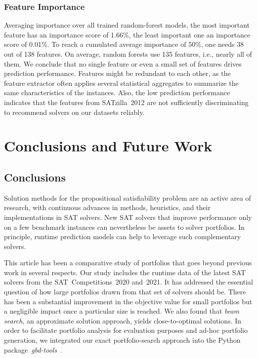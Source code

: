 \documentclass[a4paper,USenglish,pdfa]{lipics-v2021} %
\begin{document}
\subsubsection{Feature Importance}

Averaging importance over all trained random-forest models, the most important feature has an importance score of 1.66\%, the least important one an importance score of 0.01\%.
To reach a cumulated average importance of 50\%, one needs 38 out of 138 features.
On average, random forests use 135 features, i.e., nearly all of them.
We conclude that no single feature or even a small set of features drives prediction performance.
Features might be redundant to each other, as the feature extractor often applies several statistical aggregates to summarize the same characteristics of the instances.
Also, the low prediction performance indicates that the features from SATzilla~2012 are not sufficiently discriminating to recommend solvers on our datasets reliably.

\section{Conclusions and Future Work}
\label{sec:conclusion}

\subsection{Conclusions}

Solution methods for the propositional satisfiability problem are an active area of research, with continuous advances in methods, heuristics, and their implementations in SAT solvers. 
New SAT solvers that improve performance only on a few benchmark instances can nevertheless be assets to solver portfolios. 
In principle, runtime prediction models can help to leverage such complementary solvers. 

This article has been a comparative study of portfolios that goes beyond previous work in several respects.
Our study includes the runtime data of the latest SAT solvers from the SAT~Competitions~2020 and~2021. 
It has addressed the essential question of how large portfolios drawn from that set of solvers should be.
There has been a substantial improvement in the objective value for small portfolios but a negligible impact once a particular size is reached. 
We also found that \emph{beam search}, an approximate solution approach, yields close-to-optimal solutions.
In order to facilitate portfolio analysis for evaluation purposes and ad-hoc portfolio generation, we integrated our exact portfolio-search approach into the Python package~\emph{gbd-tools}~\cite{iser2020collaborative}. 
\end{document}
